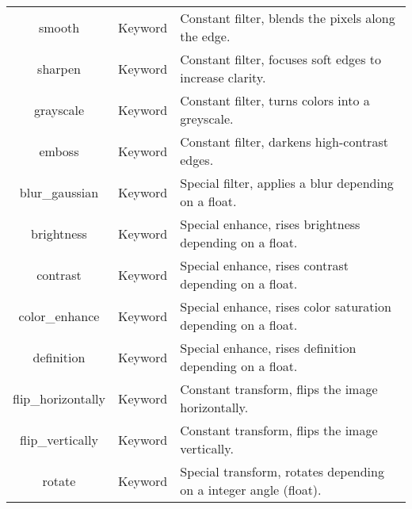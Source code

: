 \begin{longtable}[c]{|c|c|p{9.5cm}|}
    smooth & Keyword & Constant filter, blends the pixels along the edge. \\
    sharpen & Keyword & Constant filter, focuses soft edges to increase clarity. \\
    grayscale & Keyword & Constant filter, turns colors into a greyscale. \\
    emboss & Keyword & Constant filter, darkens high-contrast edges. \\
    blur\_gaussian & Keyword & Special filter, applies a blur depending on a float. \\
    brightness & Keyword & Special enhance, rises brightness depending on a float. \\
    contrast & Keyword & Special enhance, rises contrast depending on a float. \\
    color\_enhance & Keyword & Special enhance, rises color saturation depending on a float. \\
    definition & Keyword & Special enhance, rises definition depending on a float. \\
    flip\_horizontally & Keyword & Constant transform, flips the image horizontally. \\
    flip\_vertically & Keyword & Constant transform, flips the image vertically. \\
    rotate & Keyword & Special transform, rotates depending on a integer angle (float). \\
\hline

\end{longtable}